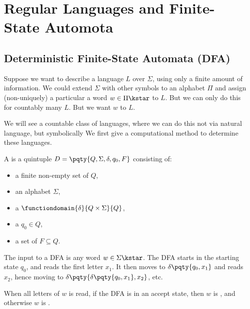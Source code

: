 \section{Regular Languages and Finite-State Automota}
\subsection{Deterministic Finite-State Automata (DFA)}

Suppose we want to describe a language \(L\) over \(\Sigma\), using only a finite amount of information. We could extend \(\Sigma\) with other symbols to an alphabet \(\Pi\) and assign (non-uniquely) a particular a word \(w \in \Pi\kstar\) to \(L\). But we can only do this for countably many \(L\). But we want \(w\) to  \(L\).


We will see a countable class of languages, where we can do this not via natural language, but symbolically We first give a computational method to determine these languages.

\begin{definition}
    A  is a quintuple \(D = \pqty{Q, \Sigma, \delta, q_0, F}\) consisting of:
    \begin{itemize}
        \item a finite non-empty set of  \(Q\),
        \item an alphabet \(\Sigma\),
        \item a  \(\functiondomain{\delta}{Q \times \Sigma}{Q}\),
        \item a  \(q_0 \in Q\),
        \item a set of  \(F \subseteq Q\).
    \end{itemize}
\end{definition}

\begin{remark}
    The input to a DFA is any word \(w \in \Sigma\kstar\). The DFA starts in the starting state \(q_0\), and reads the first letter \(x_1\). It then moves to \(\delta\pqty{q_0, x_1}\) and reads \(x_2\), hence moving to \(\delta\pqty{\delta\pqty{q_0, x_1}, x_2}\), etc.

    When all letters of \(w\) is read, if the DFA is in an accept state, then \(w\) is , and otherwise \(w\) is .
\end{remark}

